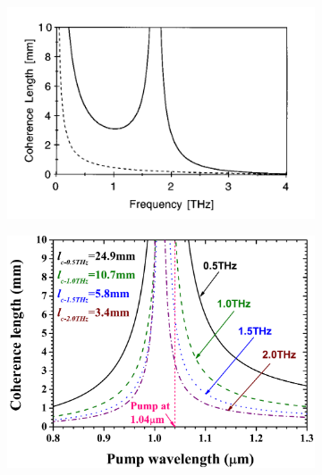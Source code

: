 \begin{figure}
    \centering
    \begin{subfigure}{.5\textwidth}%
        \centering
        \includegraphics[width=\textwidth]{refferenced_pic/coherence_length_ZnTe.png}
        \label{fig:coherence_legnth}
    \end{subfigure}%
    \hfill
    \begin{subfigure}{.5\textwidth}%
        \centering
        \includegraphics[width=\textwidth]{PLots/GAP_coherencelength.png}

\end{subfigure}
\end{figure}
